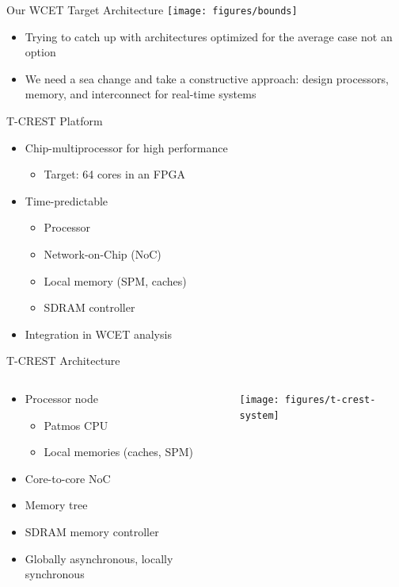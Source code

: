 \documentclass[17pt]{beamer}
\begin{document}
\begin{frame}[shrink=17]{Our WCET Target Architecture}
  \texttt{[image: figures/bounds]}
  \begin{itemize}
  \item Trying to catch up with architectures optimized for the
    average case not an option
  \item We need a sea change and take a constructive approach: design
    processors, memory, and interconnect for real-time systems
  \end{itemize}
\end{frame}

\begin{frame}{T-CREST Platform}
  \begin{itemize}
  \item Chip-multiprocessor for high performance
    \begin{itemize}
    \item Target: 64 cores in an FPGA
    \end{itemize}
  \item Time-predictable
    \begin{itemize}
    \item Processor
    \item Network-on-Chip (NoC)
    \item Local memory (SPM, caches)
    \item SDRAM controller
    \end{itemize}
  \item Integration in WCET analysis
  \end{itemize}
\end{frame}

\begin{frame}[shrink=24]{T-CREST Architecture}
  \begin{columns}
    \begin{column}{.4\textwidth}
      \begin{itemize}
      \item Processor node
        \begin{itemize}
        \item Patmos CPU
        \item Local memories (caches, SPM)
        \end{itemize}
      \item Core-to-core NoC
      \item Memory tree
      \item SDRAM memory controller
      \item Globally asynchronous, locally synchronous
      \end{itemize}
    \end{column}
    \begin{column}{.6\textwidth}
      \texttt{[image: figures/t-crest-system]}      
    \end{column}
  \end{columns}
\end{frame}
\end{document}
